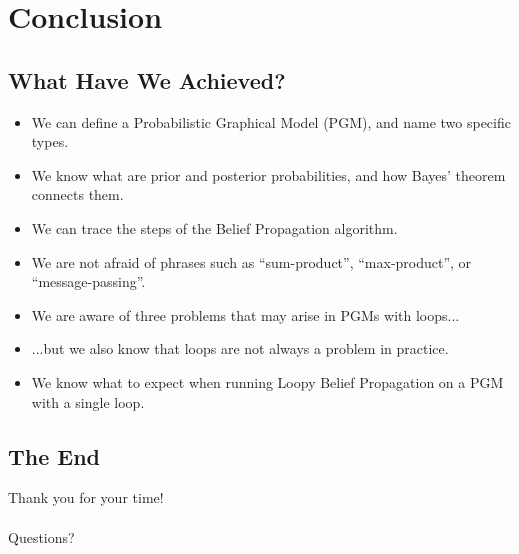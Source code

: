 \documentclass{beamer}
\begin{document}
\section{Conclusion}
\subsection{What Have We Achieved?}
\begin{frame}
    \pause
    \begin{itemize}[<+->]
        \item We can define a Probabilistic Graphical Model (PGM), and name two specific types.
        \item We know what are prior and posterior probabilities, and how Bayes' theorem connects them.
        \item We can trace the steps of the Belief Propagation algorithm.
        \item We are not afraid of phrases such as ``sum-product'', ``max-product'', or ``message-passing''.
        \item We are aware of three problems that may arise in PGMs with loops...
        \item ...but we also know that loops are not always a problem in practice.
        \item We know what to expect when running Loopy Belief Propagation on a PGM with a single loop.
    \end{itemize}
\end{frame}
\subsection{The End}
\begin{frame}
    \begin{center}
        \Huge{Thank you for your time!}\\~\\
        \pause
        \LARGE{Questions?}
    \end{center}
\end{frame}
\end{document}
